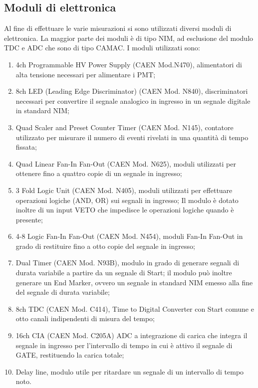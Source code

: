\documentclass{standalone}
\begin{document}
\subsection{Moduli di elettronica}
Al fine di effettuare le varie misurazioni si sono utilizzati diversi moduli di elettronica. La maggior parte dei moduli \`e di tipo NIM, ad esclusione del modulo TDC e ADC che sono di tipo CAMAC.
I moduli utilizzati sono:\\
\begin{enumerate}
	\item 4ch Programmable HV Power Supply (CAEN Mod.N470), alimentatori di alta tensione necessari per alimentare i PMT;
	\item 8ch LED (Leading Edge Discriminator) (CAEN Mod. N840), discriminatori necessari per convertire il segnale analogico in ingresso in un segnale digitale in standard NIM;
	\item Quad Scaler and Preset Counter Timer (CAEN Mod. N145), contatore utilizzato per misurare il numero di eventi rivelati in una quantit\`a di tempo fissata;
	\item Quad Linear Fan-In Fan-Out (CAEN Mod. N625), moduli utilizzati per ottenere fino a quattro copie di un segnale in ingresso;
	\item 3 Fold Logic Unit (CAEN Mod. N405), moduli utilizzati per effettuare operazioni logiche (AND, OR) sui segnali in ingresso; Il modulo \`e dotato inoltre di un input VETO che impedisce le operazioni logiche quando \`e presente;
	\item 4-8 Logic Fan-In Fan-Out (CAEN Mod. N454), moduli Fan-In Fan-Out in grado di restituire fino a otto copie del segnale in ingresso;
	\item Dual Timer (CAEN Mod. N93B), modulo in grado di generare segnali di durata variabile a partire da un segnale di Start; il modulo pu\`o inoltre generare un End Marker, ovvero un segnale in standard NIM emesso alla fine del segnale di durata variabile;
	\item 8ch TDC (CAEN Mod. C414), Time to Digital Converter con Start comune e otto canali indipendenti di misura del tempo;
	\item 16ch CIA (CAEN Mod. C205A) ADC a integrazione di carica che integra il segnale in ingresso per l'intervallo di tempo in cui \`e attivo il segnale di GATE, restituendo la carica totale;
	\item Delay line, modulo utile per ritardare un segnale di un intervallo di tempo noto.
\end{enumerate}
\end{document}
